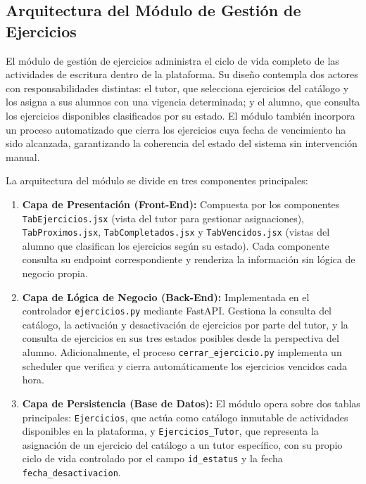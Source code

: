 
\subsection{Arquitectura del Módulo de Gestión de Ejercicios}

El módulo de gestión de ejercicios administra el ciclo de vida completo
de las actividades de escritura dentro de la plataforma. Su diseño contempla
dos actores con responsabilidades distintas: el tutor, que selecciona
ejercicios del catálogo y los asigna a sus alumnos con una vigencia
determinada; y el alumno, que consulta los ejercicios disponibles
clasificados por su estado. El módulo también incorpora un proceso
automatizado que cierra los ejercicios cuya fecha de vencimiento ha
sido alcanzada, garantizando la coherencia del estado del sistema sin
intervención manual.

La arquitectura del módulo se divide en tres componentes principales:

\begin{enumerate}
    \item \textbf{Capa de Presentación (Front-End):} Compuesta por los
    componentes \texttt{TabEjercicios.jsx} (vista del tutor para gestionar
    asignaciones), \texttt{TabProximos.jsx}, \texttt{TabCompletados.jsx}
    y \texttt{TabVencidos.jsx} (vistas del alumno que clasifican los
    ejercicios según su estado). Cada componente consulta su endpoint
    correspondiente y renderiza la información sin lógica de negocio
    propia.

    \item \textbf{Capa de Lógica de Negocio (Back-End):} Implementada
    en el controlador \texttt{ejercicios.py} mediante FastAPI. Gestiona
    la consulta del catálogo, la activación y desactivación de ejercicios
    por parte del tutor, y la consulta de ejercicios en sus tres estados
    posibles desde la perspectiva del alumno. Adicionalmente, el proceso
    \texttt{cerrar\_ejercicio.py} implementa un scheduler que verifica
    y cierra automáticamente los ejercicios vencidos cada hora.

    \item \textbf{Capa de Persistencia (Base de Datos):} El módulo opera
    sobre dos tablas principales: \texttt{Ejercicios}, que actúa como
    catálogo inmutable de actividades disponibles en la plataforma, y
    \texttt{Ejercicios\_Tutor}, que representa la asignación de un
    ejercicio del catálogo a un tutor específico, con su propio ciclo de
    vida controlado por el campo \texttt{id\_estatus} y la fecha
    \texttt{fecha\_desactivacion}.
\end{enumerate}

